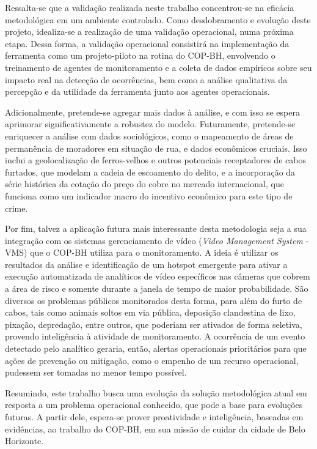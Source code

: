 Ressalta-se que a validação realizada neste trabalho concentrou-se na eficácia metodológica em um ambiente controlado. Como desdobramento e evolução deste projeto, idealiza-se a realização de uma validação operacional, numa próxima etapa. Dessa forma, a validação operacional consistirá na implementação da ferramenta como um projeto-piloto na rotina do COP-BH, envolvendo o treinamento de agentes de monitoramento e a coleta de dados empíricos sobre seu impacto real na detecção de ocorrências, bem como a análise qualitativa da percepção e da utilidade da ferramenta junto aos agentes operacionais.

Adicionalmente, pretende-se agregar mais dados à análise, e com isso se espera aprimorar significativamente a robustez do modelo. Futuramente, pretende-se enriquecer a análise com dados sociológicos, como o mapeamento de áreas de permanência de moradores em situação de rua, e dados econômicos cruciais. Isso inclui a geolocalização de ferros-velhos e outros potenciais receptadores de cabos furtados, que modelam a cadeia de escoamento do delito, e a incorporação da série histórica da cotação do preço do cobre no mercado internacional, que funciona como um indicador macro do incentivo econômico para este tipo de crime.

Por fim, talvez a aplicação futura mais interessante desta metodologia seja a sua integração com os sistemas gerenciamento de vídeo (\textit{Video Management System} - VMS) que o COP-BH utiliza para o monitoramento. A ideia é utilizar os resultados da análise e identificação de um hotspot emergente para ativar a execução automatizada de analíticos de vídeo específicos nas câmeras que cobrem a área de risco e somente durante a janela de tempo de maior probabilidade. São diversos os problemas públicos monitorados desta forma, para além do furto de cabos, tais como animais soltos em via pública, deposição clandestina de lixo, pixação, depredação, entre outros, que poderiam ser ativados de forma seletiva, provendo inteligência à atividade de monitoramento. A ocorrência de um evento detectado pelo analítico geraria, então, alertas operacionais prioritários para que ações de prevenção ou mitigação, como o empenho de um recurso operacional, pudessem ser tomadas no menor tempo possível.

Resumindo, este trabalho busca uma evolução da solução metodológica atual em resposta a um problema operacional conhecido, que pode a base para evoluções futuras. A partir dele, espera-se prover proatividade e inteligência, baseadas em evidências, ao trabalho do COP-BH, em sua missão de cuidar da cidade de Belo Horizonte.
